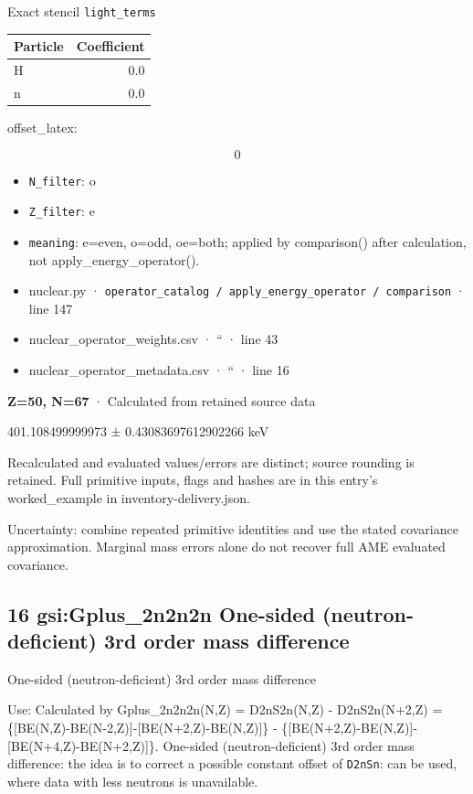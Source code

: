\documentclass[
  11pt,
  letterpaper,
]{article}
\begin{document}
Exact stencil \texttt{light\_terms}

\begin{longtable}[]{@{}lr@{}}
\toprule\noalign{}
Particle & Coefficient \\
\midrule\noalign{}
\endhead
\bottomrule\noalign{}
\endlastfoot
H & 0.0 \\
n & 0.0 \\
\end{longtable}

offset\_latex:

\[
0
\]

\begin{itemize}
\item
  \texttt{N\_filter}: o
\item
  \texttt{Z\_filter}: e
\item
  \texttt{meaning}: e=even, o=odd, oe=both; applied by comparison()
  after calculation, not apply\_energy\_operator().
\item
  nuclear.py ·
  \texttt{operator\_catalog\ /\ apply\_energy\_operator\ /\ comparison}
  · line 147
\item
  nuclear\_operator\_weights.csv · `` · line 43
\item
  nuclear\_operator\_metadata.csv · `` · line 16
\end{itemize}

\textbf{Z=50, N=67} · Calculated from retained source data

401.108499999973 ± 0.43083697612902266 keV

Recalculated and evaluated values/errors are distinct; source rounding
is retained. Full primitive inputs, flags and hashes are in this entry's
worked\_example in inventory-delivery.json.

Uncertainty: combine repeated primitive identities and use the stated
covariance approximation. Marginal mass errors alone do not recover full
AME evaluated covariance.

\subsection{16 gsi:Gplus\_2n2n2n One-sided (neutron-deficient) 3rd order
mass
difference}\label{gsigplus_2n2n2n-one-sided-neutron-deficient-3rd-order-mass-difference}

One-sided (neutron-deficient) 3rd order mass difference

Use: Calculated by Gplus\_2n2n2n(N,Z) = D2nS2n(N,Z) - D2nS2n(N+2,Z) =
\{{[}BE(N,Z)-BE(N-2,Z){]}-{[}BE(N+2,Z)-BE(N,Z){]}\} -
\{{[}BE(N+2,Z)-BE(N,Z){]}-{[}BE(N+4,Z)-BE(N+2,Z){]}\}. One-sided
(neutron-deficient) 3rd order mass difference: the idea is to correct a
possible constant offset of \texttt{D2nSn}: can be used, where data with
less neutrons is unavailable.
\end{document}
